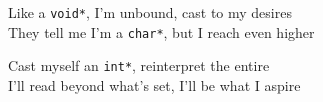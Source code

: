 




Like a \texttt{void*}, I'm unbound, cast to my desires\\
They tell me I'm a \texttt{char*}, but I reach even higher

Cast myself an \texttt{int*}, reinterpret the entire\\
I'll read beyond what's set, I'll be what I aspire




